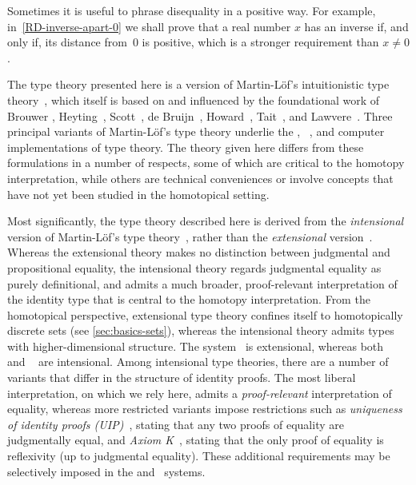 Sometimes it is useful to phrase disequality in a positive way. For example,
in~\cref{RD-inverse-apart-0} we shall prove that a real number $x$ has an inverse if,
and only if, its distance from~$0$ is positive, which is a stronger requirement than $x
\neq 0$.

%

\sectionNotes

The type theory presented here is a version of Martin-L\"{o}f's intuitionistic type 
theory~\cite{Martin-Lof-1972,Martin-Lof-1973,Martin-Lof-1979,martin-lof:bibliopolis}, which itself is based on and influenced 
by the foundational work of Brouwer \cite{beeson}, Heyting~\cite{heyting1966intuitionism}, Scott~\cite{scott70}, de 
Bruijn~\cite{deBruijn-1973}, Howard~\cite{howard:pat}, Tait~\cite{Tait-1966,Tait-1968}, and Lawvere~\cite{lawvere:adjinfound}.
%
Three principal variants of Martin-L\"{o}f's type theory underlie the \NuPRL \cite{constable+86nuprl-book}, \Coq~\cite{Coq}, and 
\Agda \cite{norell2007towards} computer implementations of type theory.  The theory given here differs from these formulations in a number 
of respects, some of which are critical to the homotopy interpretation, while others are technical conveniences or involve concepts that 
have not yet been studied in the homotopical setting.

%
%
%
%
Most significantly, the type theory described here is derived from the \emph{intensional} version of Martin-L\"{o}f's type 
theory~\cite{Martin-Lof-1973}, rather than the \emph{extensional} version~\cite{Martin-Lof-1979}.  Whereas the extensional theory makes no 
distinction between judgmental and propositional equality, the intensional theory regards judgmental equality as purely definitional, and 
admits a much broader, proof-relevant interpretation of the identity type that is central to the homotopy interpretation.  From the 
homotopical perspective, extensional type theory confines itself to homotopically discrete sets (see \cref{sec:basics-sets}), whereas the 
intensional theory admits types with higher-dimensional structure.  The \NuPRL system~\cite{constable+86nuprl-book} is extensional, whereas 
both \Coq~\cite{Coq} and \Agda~\cite{norell2007towards} are intensional.  Among intensional type theories, there are a number of variants 
that differ in the structure of identity proofs.  The most liberal interpretation, on which we rely here, admits a \emph{proof-relevant} 
interpretation of equality, whereas more restricted variants impose restrictions such as \emph{uniqueness of identity proofs 
  (UIP)}~\cite{Streicher93},
%
%
stating that any two proofs of equality are judgmentally equal, and \emph{Axiom K}~\cite{Streicher93},
stating that 
the only proof of equality is reflexivity (up to judgmental equality).  These additional requirements may be selectively imposed in the \Coq 
and \Agda\ systems.

